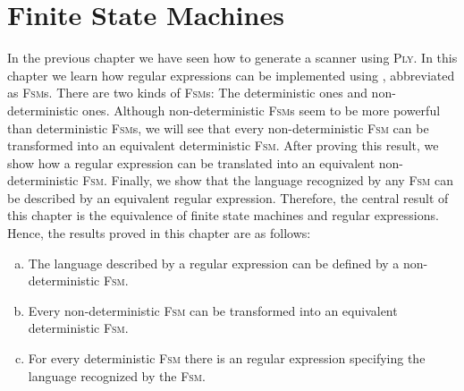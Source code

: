 \chapter{Finite State Machines\label{chapter:finite-state-machines}} 
In the previous chapter we have seen how to generate a scanner using \textsc{Ply}.  In this chapter
we learn how regular expressions can be implemented using ,
abbreviated as \textsc{Fsm}s.  There are two kinds of \textsc{Fsm}s: The deterministic ones and
non-deterministic ones.  Although non-deterministic \textsc{Fsm}s seem to be more powerful than
deterministic \textsc{Fsm}s, we will see that every non-deterministic \textsc{Fsm} can be transformed
into an equivalent deterministic \textsc{Fsm}.  After proving this result, we show how a regular
expression can be translated into an equivalent non-deterministic \textsc{Fsm}.  Finally, we show that the
language recognized by any \textsc{Fsm} can be described by an equivalent regular expression.  Therefore, the
central result of this chapter is the equivalence of finite state machines and regular expressions.
Hence, the results proved in this chapter are as follows:
\begin{enumerate}[(a)]
\item The language described by a regular expression can be defined by a non-deterministic \textsc{Fsm}.
\item Every non-deterministic \textsc{Fsm} can be transformed into an equivalent deterministic \textsc{Fsm}.
\item For every deterministic \textsc{Fsm} there is an regular expression specifying the language recognized by
      the \textsc{Fsm}.
\end{enumerate}


